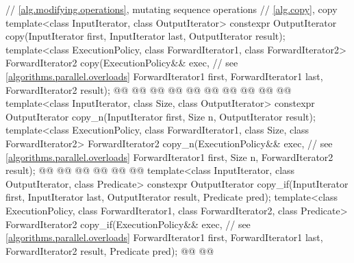 \begin{codeblock}
{  // \ref{alg.modifying.operations}, mutating sequence operations
  // \ref{alg.copy}, copy
  template<class InputIterator, class OutputIterator>
    constexpr OutputIterator copy(InputIterator first, InputIterator last,
                                  OutputIterator result);
  template<class ExecutionPolicy, class ForwardIterator1, class ForwardIterator2>
    ForwardIterator2 copy(ExecutionPolicy&& exec, // see \ref{algorithms.parallel.overloads}
                          ForwardIterator1 first, ForwardIterator1 last,
                          ForwardIterator2 result);
  @@
    @@
      @@
      @@
        @@
    @@
      @@
      @@
        @@
  @\added{\}}@
  template<class InputIterator, class Size, class OutputIterator>
    constexpr OutputIterator copy_n(InputIterator first, Size n,
                                    OutputIterator result);
  template<class ExecutionPolicy, class ForwardIterator1, class Size,
           class ForwardIterator2>
    ForwardIterator2 copy_n(ExecutionPolicy&& exec, // see \ref{algorithms.parallel.overloads}
                            ForwardIterator1 first, Size n,
                            ForwardIterator2 result);
  @@
    @@
      @@
      @@
        @@
  @\added{\}}@
  template<class InputIterator, class OutputIterator, class Predicate>
    constexpr OutputIterator copy_if(InputIterator first, InputIterator last,
                                     OutputIterator result, Predicate pred);
  template<class ExecutionPolicy, class ForwardIterator1, class ForwardIterator2,
           class Predicate>
    ForwardIterator2 copy_if(ExecutionPolicy&& exec, // see \ref{algorithms.parallel.overloads}
                             ForwardIterator1 first, ForwardIterator1 last,
                             ForwardIterator2 result, Predicate pred);
  @@
    @@
}
\end{codeblock}
